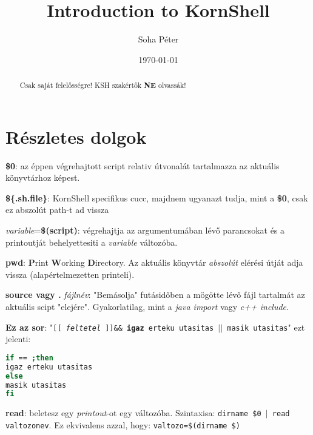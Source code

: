 \documentclass{article}
\begin{document}
\title{Introduction to KornShell}
\author{Soha Péter}
\date{\today}

\maketitle

\begin{abstract}
Csak saját felelősségre! KSH szakértők \textbf{NE} olvassák!
\end{abstract}

\section{Részletes dolgok}
\textbf{\$0}: az éppen végrehajtott script relativ útvonalát tartalmazza az aktuális könyvtárhoz képest.\newline

\textbf{\$\{.sh.file\}}: KornShell specifikus cucc,  majdnem ugyanazt tudja, mint a \textbf{\$0}, csak ez abszolút path-t ad vissza\newline

\textit{variable}=\textbf{\$(script)}: végrehajtja az argumentumában lévő parancsokat és a printoutját behelyettesiti a \textit{variable} változóba.\newline

\textbf{pwd}: \textbf{P}rint \textbf{W}orking \textbf{D}irectory. Az aktuális könyvtár \textit{abszolút} elérési útját adja vissza (alapértelmezetten printeli).\newline

\textbf{source vagy .} \textit{fájlnév}: "Bemásolja" futásidőben a mögötte lévő fájl tartalmát az aktuális scipt "elejére". Gyakorlatilag, mint a \textit{java import} vagy \textit{c++ include}.\newline 

\textbf{Ez az sor}: 
"\texttt{[[ \textit{feltetel} ]]\&\& \textbf{igaz} erteku utasitas $||$ masik utasitas}" ezt jelenti: 
\begin{lstlisting}[language=bash]
if == ;then
igaz erteku utasitas 
else
masik utasitas
fi
\end{lstlisting}

\textbf{read}: beletesz egy \textit{printout}-ot egy változóba. Szintaxisa: \texttt{dirname \$0 $|$ read valtozonev}. Ez ekvivalens azzal, hogy: \texttt{valtozo=\$(dirname \$)}\newline


\newpage
\end{document}

